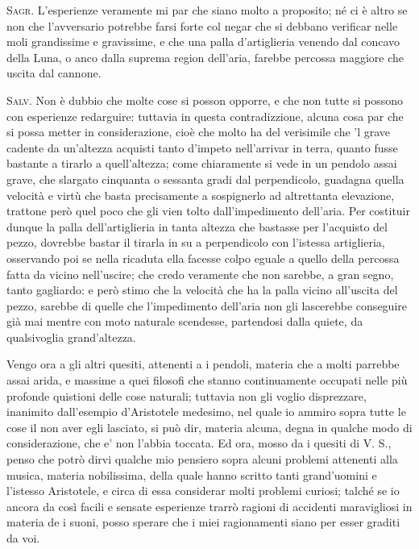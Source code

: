 \documentclass[11pt,twoside,openany]{book}
\newcommand{\speaker}[1]{\textcolor{rubric}{\textsc{#1}}\space}
\begin{document}
\speaker{Sagr.} L'esperienze veramente mi par che siano molto a proposito; né ci è altro se non che l'avversario potrebbe farsi forte col negar che si debbano verificar nelle moli grandissime e gravissime, e che una palla d'artiglieria venendo dal concavo della Luna, o anco dalla suprema region dell'aria, farebbe percossa maggiore che uscita dal cannone.

\speaker{Salv.} Non è dubbio che molte cose si posson opporre, e che non tutte si possono con esperienze redarguire: tuttavia in questa contradizzione, alcuna cosa par che si possa metter in considerazione, cioè che molto ha del verisimile che 'l grave cadente da un'altezza acquisti tanto d'impeto nell'arrivar in terra, quanto fusse bastante a tirarlo a quell'altezza; come chiaramente si vede in un pendolo assai grave, che slargato cinquanta o sessanta gradi dal perpendicolo, guadagna quella velocità e virtù che basta precisamente a sospignerlo ad altrettanta elevazione, trattone però quel poco che gli vien tolto dall'impedimento dell'aria. Per costituir dunque la palla dell'artiglieria in tanta altezza che bastasse per l'acquisto del pezzo, dovrebbe bastar il tirarla in su a perpendicolo con l'istessa artiglieria, osservando poi se nella ricaduta ella facesse colpo eguale a quello della percossa fatta da vicino nell'uscire; che credo veramente che non sarebbe, a gran segno, tanto gagliardo: e però stimo che la velocità che ha la palla vicino all'uscita del pezzo, sarebbe di quelle che l'impedimento dell'aria non gli lascerebbe conseguire già mai mentre con moto naturale scendesse, partendosi dalla quiete, da qualsivoglia grand'altezza.

Vengo ora a gli altri quesiti, attenenti a i pendoli, materia che a molti parrebbe assai arida, e massime a quei filosofi che stanno continuamente occupati nelle più profonde quistioni delle cose naturali; tuttavia non gli voglio disprezzare, inanimito dall'esempio d'Aristotele medesimo, nel quale io ammiro sopra tutte le cose il non aver egli lasciato, si può dir, materia alcuna, degna in qualche modo di considerazione, che e' non l'abbia toccata. Ed ora, mosso da i quesiti di V. S., penso che potrò dirvi qualche mio pensiero sopra alcuni problemi attenenti alla musica, materia nobilissima, della quale hanno scritto tanti grand'uomini e l'istesso Aristotele, e circa di essa considerar molti problemi curiosi; talché se io ancora da così facili e sensate esperienze trarrò ragioni di accidenti maravigliosi in materia de i suoni, posso sperare che i miei ragionamenti siano per esser graditi da voi.
\end{document}
